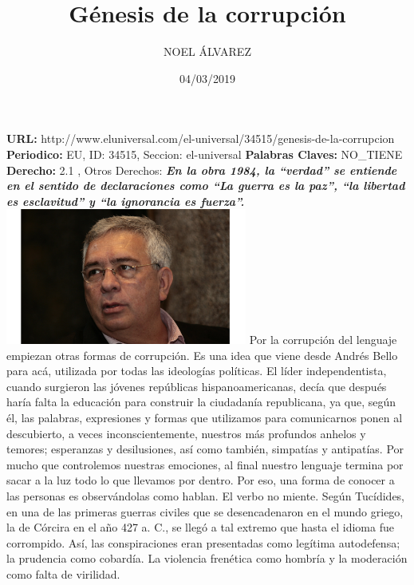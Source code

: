 \documentclass{article}%
\title{\textbf{Génesis de la corrupción}}%
\author{NOEL ÁLVAREZ}%
\date{04/03/2019}%
\begin{document}
%
\normalsize%
\maketitle%
\textbf{URL: }%
http://www.eluniversal.com/el{-}universal/34515/genesis{-}de{-}la{-}corrupcion\newline%
%
\textbf{Periodico: }%
EU, %
ID: %
34515, %
Seccion: %
el{-}universal\newline%
%
\textbf{Palabras Claves: }%
NO\_TIENE\newline%
%
\textbf{Derecho: }%
2.1%
, Otros Derechos: %
\newline%
%
\textbf{\textit{En la obra 1984, la “verdad” se entiende en el sentido de declaraciones como “La guerra es la paz”, “la libertad es esclavitud” y “la ignorancia es fuerza”.}}%
\newline%
\newline%
%
\includegraphics[width=300px]{EU_34515.jpg}%
\newline%
%
Por la corrupción del lenguaje empiezan otras formas de corrupción. Es una idea que viene  desde Andrés Bello para acá, utilizada por todas las ideologías políticas. El líder independentista, cuando surgieron las jóvenes repúblicas hispanoamericanas, decía que después haría falta la educación para construir la ciudadanía republicana, ya que,  según él, las palabras, expresiones y formas que utilizamos para comunicarnos ponen al descubierto, a veces inconscientemente, nuestros más profundos anhelos y temores; esperanzas y desilusiones, así como también, simpatías y antipatías.%
\newline%
%
Por mucho que controlemos nuestras emociones, al final nuestro lenguaje termina por sacar a la luz todo lo que llevamos por dentro. Por eso, una forma de conocer a las personas es observándolas como hablan.  El verbo no miente. Según Tucídides, en una de las primeras guerras civiles que se desencadenaron en el mundo griego, la de Córcira en el año 427 a. C., se llegó a tal extremo que hasta el idioma fue corrompido. Así, las conspiraciones eran presentadas como legítima autodefensa; la prudencia como cobardía. La violencia frenética como hombría y la moderación como falta de virilidad.%
\end{document}
